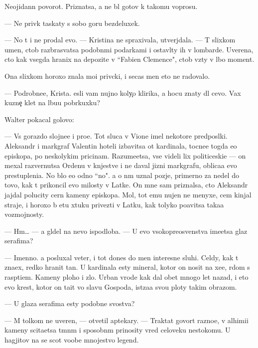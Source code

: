 \documentclass[10pt]{book}
\begin{document}
Neojidann{\yi}{\y} povorot. Priznatsa, {\y}a ne b{\yi}l gotov k takomu voprosu.

— Ne priv{\yi}k taskaty s sobo{\y} goru bezdeluxek.

— No t{\yi} i ne prodal {\y}evo. — Kristina ne spraxivala, utverjdala. — T{\yi} slixkom umen, ctob{\yi} razbras{\yi}vatsa podobn{\yi}mi podarkami i ostavl{\ia}ty ih v lombarde. Uverena, cto kak vsegda hranix na depozite v ``Fabien Clemence", ctob{\yi} vz{\ia}ty v l{\iu}bo{\y} moment.

Ona slixkom horoxo znala mo{\y}i priv{\yi}cki, i se{\y}cas men{\ia} eto ne radovalo.

— Podrobne{\y}e, Krista. {\Y}esli vam nujno koly{\c}o klirika, {\y}a hocu znaty dl{\ia} cevo. Vax kuzne{\c} kl{\iu}{\y}et na l{\iu}bu{\y}u pobr{\ia}kuxku?

Walter pokacal golovo{\y}:

— Vs{\e} gorazdo slojne{\y}e i pro{\x}e. Tot sluca{\y} v Vione imel nekotor{\yi}{\y}e predpos{\yi}lki. Aleksandr i markgraf Valentin hoteli izbavitsa ot kardinala, tocne{\y}e togda {\y}e{\x}o {\y}episkopa, po neskolykim pricinam. Razume{\y}etsa, vse videli lix politiceski{\y}e — on mexal razvernutsa Ordenu v kn{\ia}jestve i ne daval jizni markgrafu, oblica{\y}a {\y}evo prestupleni{\y}a. No b{\yi}lo {\y}e{\x}o odno ``no". {\Y}a o n{\e}m uznal pozje, primerno za nedel{\iu} do tovo, kak t{\yi} prikoncil {\y}evo milosty v Latke. On mne sam priznalsa, cto Aleksandr jajdal polucity cern{\yi}{\y} kameny {\y}episkopa. Mol, tot {\y}emu nujen ne menyxe, cem kinjal{\yi} straje{\y}, i horoxo b{\yi} etu xtuku privezti v Latku, kak tolyko po{\y}avitsa taka{\y}a vozmojnosty.

— Hm… — {\Y}a gl{\ia}del na nevo ispodlob{\y}a. — U {\y}evo v{\yi}sokopreosv{\ia}{\x}enstva ime{\y}etsa glaz serafima?

— Imenno. {\Y}a posluxal veter, i tot dones do men{\ia} interesn{\yi}{\y}e sluhi. Cel{\ia}dy, kak t{\yi} zna{\y}ex, redko hranit ta{\y}n{\yi}. U kardinala {\y}esty mineral, kotor{\yi}{\y} on nosit na xe{\y}e, r{\ia}dom s rasp{\ia}ti{\y}em. Kameny ploho{\y} i zlo{\y}. Urban vrode kak dal obet mnogo let nazad, i eto {\y}evo krest, kotor{\yi}{\y} on ta{\x}it vo slavu Gospoda, ist{\ia}za{\y}a svo{\y}u ploty takim obrazom.

— U glaza serafima {\y}esty podobn{\yi}{\y}e svo{\y}stva?

— M{\yi} tolkom ne uveren{\yi}, — otvetil aptekary. — Traktat{\yi} govor{\ia}t razno{\y}e, v alhimi{\y}i kameny scita{\y}etsa t{\e}mn{\yi}m i sposobn{\yi}m prinosity vred celoveku nesto{\y}komu. U hagjitov na se{\y} scot voob{\x}e mnojestvo legend.
\end{document}
